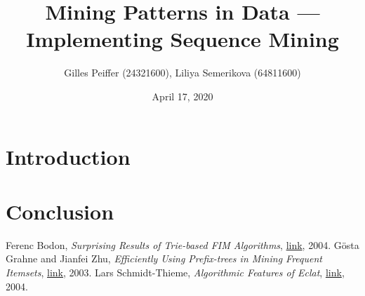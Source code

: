 \documentclass[journal, 9pt]{IEEEtran}
\title{Mining Patterns in Data --- Implementing Sequence Mining}
\author{Gilles Peiffer (24321600), Liliya Semerikova (64811600)}
\date{April 17, 2020}
\theoremstyle{definition}
\begin{document}
\maketitle

\begin{abstract}
	
\end{abstract}

\section*{Introduction}

\section*{Conclusion}

\begin{thebibliography}{9}
	Ferenc Bodon, \textit{Surprising Results of Trie-based FIM Algorithms}, \href{http://sunsite.informatik.rwth-aachen.de/Publications/CEUR-WS/Vol-126/bodon.pdf}{link}, 2004.
	Gösta Grahne and Jianfei Zhu, \textit{Efficiently Using Prefix-trees in Mining Frequent Itemsets}, \href{http://ceur-ws.org/Vol-90/grahne.pdf}{link}, 2003.
	Lars Schmidt-Thieme, \textit{Algorithmic Features of Eclat}, \href{http://sunsite.informatik.rwth-aachen.de/Publications/CEUR-WS/Vol-126/schmidtthieme.pdf}{link}, 2004.
\end{thebibliography}
\end{document}
